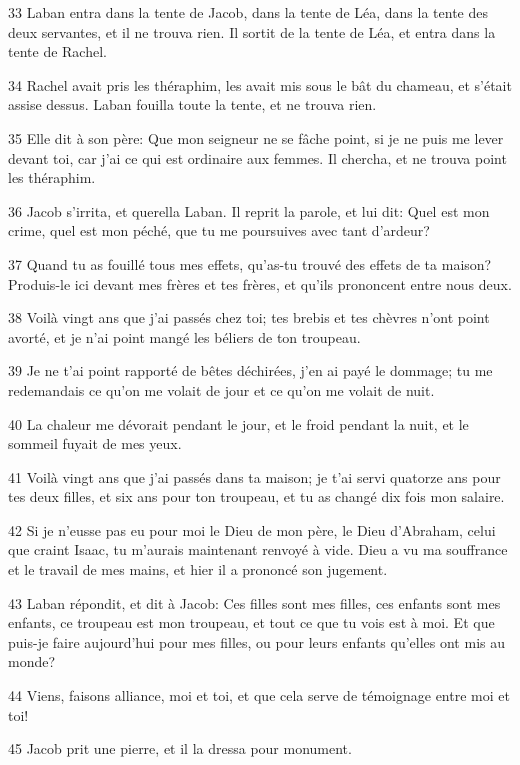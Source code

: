 \par 33 Laban entra dans la tente de Jacob, dans la tente de Léa, dans la tente des deux servantes, et il ne trouva rien. Il sortit de la tente de Léa, et entra dans la tente de Rachel.
\par 34 Rachel avait pris les théraphim, les avait mis sous le bât du chameau, et s'était assise dessus. Laban fouilla toute la tente, et ne trouva rien.
\par 35 Elle dit à son père: Que mon seigneur ne se fâche point, si je ne puis me lever devant toi, car j'ai ce qui est ordinaire aux femmes. Il chercha, et ne trouva point les théraphim.
\par 36 Jacob s'irrita, et querella Laban. Il reprit la parole, et lui dit: Quel est mon crime, quel est mon péché, que tu me poursuives avec tant d'ardeur?
\par 37 Quand tu as fouillé tous mes effets, qu'as-tu trouvé des effets de ta maison? Produis-le ici devant mes frères et tes frères, et qu'ils prononcent entre nous deux.
\par 38 Voilà vingt ans que j'ai passés chez toi; tes brebis et tes chèvres n'ont point avorté, et je n'ai point mangé les béliers de ton troupeau.
\par 39 Je ne t'ai point rapporté de bêtes déchirées, j'en ai payé le dommage; tu me redemandais ce qu'on me volait de jour et ce qu'on me volait de nuit.
\par 40 La chaleur me dévorait pendant le jour, et le froid pendant la nuit, et le sommeil fuyait de mes yeux.
\par 41 Voilà vingt ans que j'ai passés dans ta maison; je t'ai servi quatorze ans pour tes deux filles, et six ans pour ton troupeau, et tu as changé dix fois mon salaire.
\par 42 Si je n'eusse pas eu pour moi le Dieu de mon père, le Dieu d'Abraham, celui que craint Isaac, tu m'aurais maintenant renvoyé à vide. Dieu a vu ma souffrance et le travail de mes mains, et hier il a prononcé son jugement.
\par 43 Laban répondit, et dit à Jacob: Ces filles sont mes filles, ces enfants sont mes enfants, ce troupeau est mon troupeau, et tout ce que tu vois est à moi. Et que puis-je faire aujourd'hui pour mes filles, ou pour leurs enfants qu'elles ont mis au monde?
\par 44 Viens, faisons alliance, moi et toi, et que cela serve de témoignage entre moi et toi!
\par 45 Jacob prit une pierre, et il la dressa pour monument.
